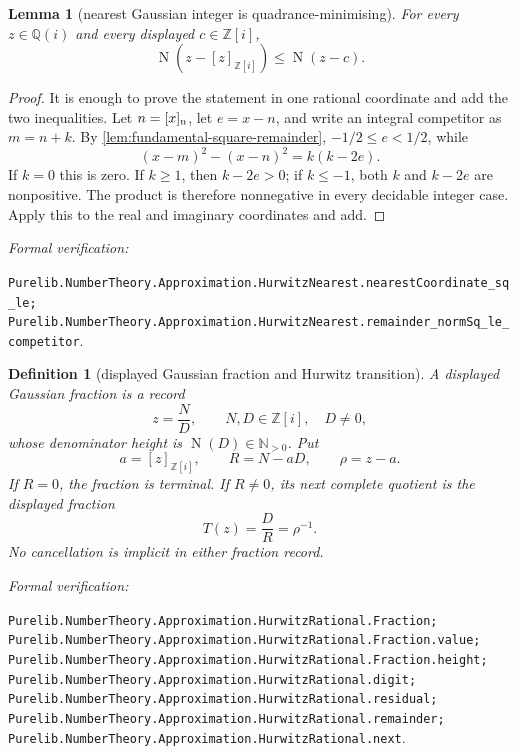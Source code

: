\documentclass[11pt]{article}
\newtheorem{lemma}[lemma]{Lemma}
\newtheorem{definition}[definition]{Definition}
\newcommand{\Qi}{\mathbb{Q}(i)}
\newcommand{\Zi}{\mathbb{Z}[i]}
\newcommand{\N}{\mathbb{N}}
\newcommand{\Norm}[1]{\operatorname{N}\!\left(#1\right)}
\newcommand{\leanref}[1]{\par\smallskip\noindent
  \emph{Formal verification:}\par\nobreak
  {\raggedright\nolinkurl{#1}.\par}}
\begin{document}
\begin{lemma}[nearest Gaussian integer is quadrance-minimising]
\label{lem:nearest-minimises}
For every $z\in\Qi$ and every displayed $c\in\Zi$,
\begin{equation}
\label{eq:nearest-minimises}
                    \Norm{z-[z]_{\Zi}}\le\Norm{z-c}.
\end{equation}
\end{lemma}

\begin{proof}
It is enough to prove the statement in one rational coordinate and add the
two inequalities.  Let $n=[x]_{\rm n}$, let $e=x-n$, and write an integral
competitor as $m=n+k$.  By \cref{lem:fundamental-square-remainder},
$-1/2\le e<1/2$, while
\[
                     (x-m)^2-(x-n)^2=k(k-2e).
\]
If $k=0$ this is zero.  If $k\ge1$, then $k-2e>0$; if $k\le-1$, both $k$ and
$k-2e$ are nonpositive.  The product is therefore nonnegative in every
decidable integer case.  Apply this to the real and imaginary coordinates
and add.
\end{proof}

\leanref{Purelib.NumberTheory.Approximation.HurwitzNearest.nearestCoordinate_sq_le;
Purelib.NumberTheory.Approximation.HurwitzNearest.remainder_normSq_le_competitor}

\begin{definition}[displayed Gaussian fraction and Hurwitz transition]
\label{def:hurwitz-transition}
A displayed Gaussian fraction is a record
\[
                         z=\frac ND,
              \qquad N,D\in\Zi,\quad D\ne0,
\]
whose denominator height is $\Norm D\in\N_{>0}$.  Put
\begin{equation}
\label{eq:hurwitz-division}
 a=[z]_{\Zi},\qquad R=N-aD,
 \qquad \rho=z-a.
\end{equation}
If $R=0$, the fraction is terminal.  If $R\ne0$, its next complete quotient
is the displayed fraction
\begin{equation}
\label{eq:hurwitz-next}
                         T(z)=\frac D R=\rho^{-1}.
\end{equation}
No cancellation is implicit in either fraction record.
\end{definition}

\leanref{Purelib.NumberTheory.Approximation.HurwitzRational.Fraction;
Purelib.NumberTheory.Approximation.HurwitzRational.Fraction.value;
Purelib.NumberTheory.Approximation.HurwitzRational.Fraction.height;
Purelib.NumberTheory.Approximation.HurwitzRational.digit;
Purelib.NumberTheory.Approximation.HurwitzRational.residual;
Purelib.NumberTheory.Approximation.HurwitzRational.remainder;
Purelib.NumberTheory.Approximation.HurwitzRational.next}
\end{document}
